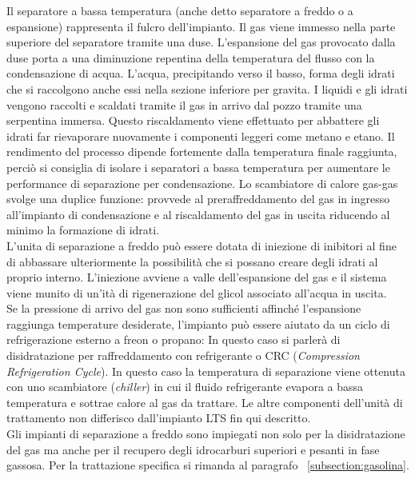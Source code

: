 Il separatore a bassa temperatura (anche detto separatore a freddo o a espansione) rappresenta il fulcro dell'impianto. Il gas viene immesso nella parte superiore del separatore tramite una duse. L'espansione del gas provocato dalla duse porta a una diminuzione repentina della temperatura del flusso con la condensazione di acqua. L'acqua, precipitando verso il basso, forma degli idrati che si raccolgono anche essi nella sezione inferiore per gravita. I liquidi e gli idrati vengono raccolti e scaldati tramite il gas in arrivo dal pozzo tramite una serpentina immersa. Questo riscaldamento viene effettuato per abbattere gli idrati far rievaporare nuovamente i componenti leggeri come metano e etano. Il rendimento del processo dipende fortemente dalla temperatura finale raggiunta, perciò si consiglia di isolare i separatori a bassa temperatura per aumentare le performance di separazione per condensazione.
Lo scambiatore di calore gas-gas svolge una duplice funzione: provvede al preraffreddamento del gas in ingresso all'impianto di condensazione e al riscaldamento del gas in uscita riducendo al minimo la formazione di idrati. \\
L'unita di separazione a freddo può essere dotata di iniezione di inibitori al fine di abbassare ulteriormente la possibilità che si possano creare degli idrati al proprio interno. L'iniezione avviene a valle dell'espansione del gas e il sistema viene munito di un'ità di rigenerazione del glicol associato all'acqua in uscita.\\
Se la pressione di arrivo del gas non sono sufficienti affinché l'espansione raggiunga temperature desiderate, l'impianto può essere aiutato da un ciclo di refrigerazione esterno a freon o propano: In questo caso si parlerà di disidratazione per raffreddamento con refrigerante o CRC (\textit{Compression Refrigeration Cycle}). In questo caso la temperatura di separazione viene ottenuta con uno scambiatore (\textit{chiller}) in cui il fluido refrigerante evapora a bassa temperatura e sottrae calore al gas da trattare. Le altre componenti dell'unità di trattamento non differisco dall'impianto LTS fin qui descritto.\\
Gli impianti di separazione a freddo sono impiegati non solo per la disidratazione del gas ma anche per il recupero degli idrocarburi superiori e pesanti in fase gassosa. Per la trattazione specifica si rimanda al paragrafo ~\ref{subsection:gasolina}.


